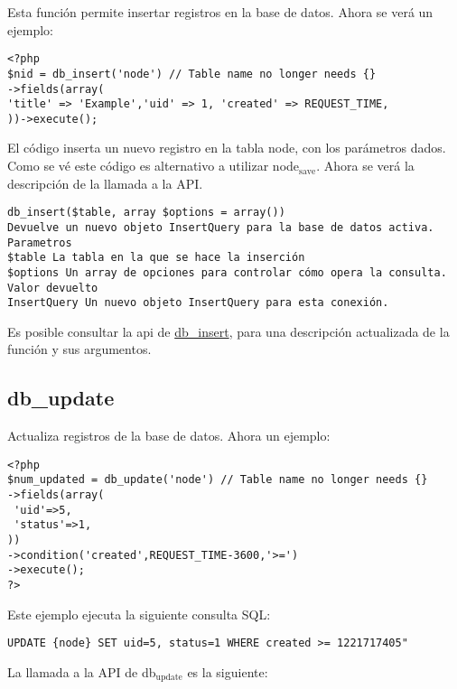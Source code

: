 \documentclass[11pt]{article}
\begin{document}
Esta función permite insertar registros en la base de datos. Ahora se
verá un ejemplo:


\begin{verbatim}
<?php
$nid = db_insert('node') // Table name no longer needs {}
->fields(array(
'title' => 'Example','uid' => 1, 'created' => REQUEST_TIME,
))->execute();
\end{verbatim}



El código inserta un nuevo registro en la tabla node, con los
parámetros dados. Como se vé este código es alternativo a utilizar
node$_{\mathrm{save}}$. Ahora se verá la descripción de la llamada a la API.


\begin{verbatim}
db_insert($table, array $options = array()) 
Devuelve un nuevo objeto InsertQuery para la base de datos activa.
Parametros
$table La tabla en la que se hace la inserción
$options Un array de opciones para controlar cómo opera la consulta.
Valor devuelto
InsertQuery Un nuevo objeto InsertQuery para esta conexión.
\end{verbatim}



Es posible consultar la api de \href{http://api.drupal.org/api/drupal/includes--database--database.inc/function/db_insert/7}{db\_insert}, para una descripción
actualizada de la función y sus argumentos.

\subsection{db\_update}
\label{sec-1.15}


Actualiza registros de la base de datos. Ahora un ejemplo:


\begin{verbatim}
<?php
$num_updated = db_update('node') // Table name no longer needs {}
->fields(array(
 'uid'=>5,
 'status'=>1,
))
->condition('created',REQUEST_TIME-3600,'>=')
->execute();
?>
\end{verbatim}



Este ejemplo ejecuta la siguiente consulta SQL: 


\begin{verbatim}
UPDATE {node} SET uid=5, status=1 WHERE created >= 1221717405"
\end{verbatim}



La llamada a la API de db$_{\mathrm{update}}$ es la siguiente:
\end{document}
